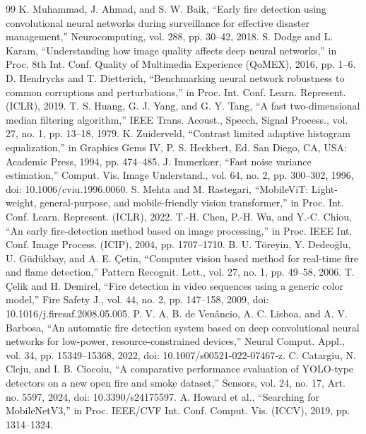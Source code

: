 \documentclass[10pt,twocolumn,letterpaper]{article}
\begin{document}
\balance
\renewcommand{\refname}{References}
\begin{thebibliography}{99}
\footnotesize
{} K. Muhammad, J. Ahmad, and S. W. Baik, ``Early fire detection using convolutional neural networks during surveillance for effective disaster management,'' Neurocomputing, vol. 288, pp. 30--42, 2018.
 S. Dodge and L. Karam, ``Understanding how image quality affects deep neural networks,'' in Proc. 8th Int. Conf. Quality of Multimedia Experience (QoMEX), 2016, pp. 1--6.
 D. Hendrycks and T. Dietterich, ``Benchmarking neural network robustness to common corruptions and perturbations,'' in Proc. Int. Conf. Learn. Represent. (ICLR), 2019.
 T. S. Huang, G. J. Yang, and G. Y. Tang, ``A fast two-dimensional median filtering algorithm,'' IEEE Trans. Acoust., Speech, Signal Process., vol. 27, no. 1, pp. 13--18, 1979.
 K. Zuiderveld, ``Contrast limited adaptive histogram equalization,'' in Graphics Gems IV, P. S. Heckbert, Ed. San Diego, CA, USA: Academic Press, 1994, pp. 474--485.
 J. Immerkær, ``Fast noise variance estimation,'' Comput. Vis. Image Understand., vol. 64, no. 2, pp. 300--302, 1996, doi: 10.1006/cviu.1996.0060.
 S. Mehta and M. Rastegari, ``MobileViT: Light-weight, general-purpose, and mobile-friendly vision transformer,'' in Proc. Int. Conf. Learn. Represent. (ICLR), 2022.
 T.-H. Chen, P.-H. Wu, and Y.-C. Chiou, ``An early fire-detection method based on image processing,'' in Proc. IEEE Int. Conf. Image Process. (ICIP), 2004, pp. 1707--1710.
 B. U. Töreyin, Y. Dedeoğlu, U. Güdükbay, and A. E. Çetin, ``Computer vision based method for real-time fire and flame detection,'' Pattern Recognit. Lett., vol. 27, no. 1, pp. 49--58, 2006.
 T. Çelik and H. Demirel, ``Fire detection in video sequences using a generic color model,'' Fire Safety J., vol. 44, no. 2, pp. 147--158, 2009, doi: 10.1016/j.firesaf.2008.05.005.
 P. V. A. B. de Venâncio, A. C. Lisboa, and A. V. Barbosa, ``An automatic fire detection system based on deep convolutional neural networks for low-power, resource-constrained devices,'' Neural Comput. Appl., vol. 34, pp. 15349--15368, 2022, doi: 10.1007/s00521-022-07467-z.
 C. Catargiu, N. Cleju, and I. B. Ciocoiu, ``A comparative performance evaluation of YOLO-type detectors on a new open fire and smoke dataset,'' Sensors, vol. 24, no. 17, Art. no. 5597, 2024, doi: 10.3390/s24175597.
 A. Howard et al., ``Searching for MobileNetV3,'' in Proc. IEEE/CVF Int. Conf. Comput. Vis. (ICCV), 2019, pp. 1314--1324.

\end{thebibliography}
\end{document}
